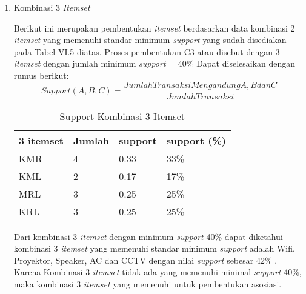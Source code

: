 \begin{enumerate}
\pagebreak
\item Kombinasi 3 \textit{Itemset}
\par Berikut ini merupakan pembentukan  \textit{itemset} berdasarkan data kombinasi 2 \textit{itemset}  yang memenuhi standar minimum \textit{support} yang sudah disediakan pada Tabel VI.5 diatas. Proses pembentukan C3 atau disebut dengan 3 \textit{itemset} dengan jumlah minimum \textit{support} = 40\% Dapat diselesaikan dengan rumus berikut:
\begin{equation}
Support (A,B,C) =\frac{Jumlah Transaksi Mengandung A,B dan C}{Jumlah Transaksi} 
\end{equation}
\begin{table}[!ht]
\caption{Support Kombinasi 3 Itemset}
\centering
\begin{tabular}{|l|l|l|l|}
\hline
3 itemset & Jumlah & support & support (\%) \\ \hline
KMR       & 4      & 0.33    & 33\%         \\ \hline
KML       & 2      & 0.17    & 17\%         \\ \hline
MRL       & 3      & 0.25    & 25\%         \\ \hline
KRL       & 3      & 0.25    & 25\%         \\ \hline
\end{tabular}
\end{table}

\par Dari kombinasi 3 \textit{itemset} dengan minimum \textit{support} 40\% dapat diketahui kombinasi 3 \textit{itemset} yang memenuhi standar minimum \textit{support} adalah Wifi, Proyektor, Speaker, AC dan CCTV dengan nilai \textit{support} sebesar 42\% . Karena Kombinasi 3 \textit{itemset} tidak ada yang memenuhi minimal \textit{support} 40\%, maka kombinasi 3 \textit{itemset} yang memenuhi untuk pembentukan asosiasi.
\end{enumerate}

